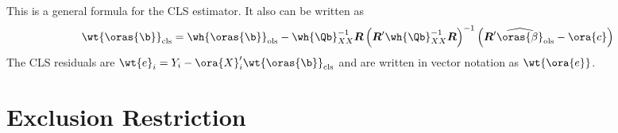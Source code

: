 This is a general formula for the CLS estimator. It also can be written as
\begin{equation}
    \label{hansen_eq_8_9}
    \wt{\oras{\b}}_{\text{cls}} = \wh{\oras{\b}}_{\text{ols}} - \wh{\Qb}_{XX}^{-1} \boldsymbol{R}\left(\boldsymbol{R}^{\prime}\wh{\Qb}_{XX}^{-1} \boldsymbol{R}\right)^{-1}\left(\boldsymbol{R}^{\prime} \widehat{\oras{\beta}}_{\text{ols}}-\ora{c}\right)
\end{equation}
The CLS residuals are $\wt{e}_i = Y_i - \ora{X}_i^\prime \wt{\oras{\b}}_{\text{cls}}$ and are written in vector notation as $\wt{\ora{e}}$.


\section{Exclusion Restriction}

